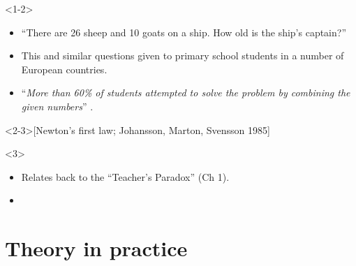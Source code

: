 \begin{frame}
  \begin{onlyenv}<1-2>
    \begin{remark}
      \begin{itemize}
        \item \enquote{There are 26 sheep and 10 goats on a ship.
          How old is the ship's captain?}
        \item This and similar questions given to primary school students in a 
          number of European countries.
        \item \enquote{\emph{More than 60\% of students attempted to solve the 
            problem by combining the given numbers}} .
      \end{itemize}
    \end{remark}
  \end{onlyenv}

  \begin{example}<2-3>[Newton's first law; Johansson, Marton, Svensson 1985]
  \end{example}

  \begin{onlyenv}<3>
    \begin{remark}
      \begin{itemize}
        \item Relates back to the \enquote{Teacher's Paradox} (Ch 1).
        \item {}
      \end{itemize}
    \end{remark}
  \end{onlyenv}
\end{frame}


\section{Theory in practice}


